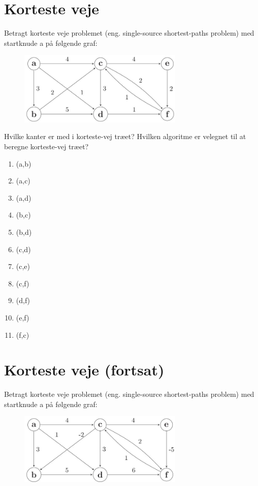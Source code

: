 \documentclass[12pt,a4paper]{article}
\begin{document}
\section{Korteste veje}

Betragt korteste veje problemet (eng. single-source shortest-paths problem) med startknude a på følgende graf:

\begin{figure}[h]
    \centering
    \includegraphics[width=0.7\textwidth]{Ugeopgave_5_markdown/Ugeopgave_5/_page_2_Figure_9.jpeg}
\end{figure}

Hvilke kanter er med i korteste-vej træet? Hvilken algoritme er velegnet til at beregne korteste-vej træet?

\begin{enumerate}
    \item (a,b)
    \item (a,c)
    \item (a,d)
    \item (b,c)
    \item (b,d)
    \item (c,d)
    \item (c,e)
    \item (c,f)
    \item (d,f)
    \item (e,f)
    \item (f,c)
\end{enumerate}

\section{Korteste veje (fortsat)}

Betragt korteste veje problemet (eng. single-source shortest-paths problem) med startknude a på følgende graf:

\begin{figure}[h]
    \centering
    \includegraphics[width=0.7\textwidth]{Ugeopgave_5_markdown/Ugeopgave_5/_page_3_Figure_7.jpeg}
\end{figure}
\end{document}
